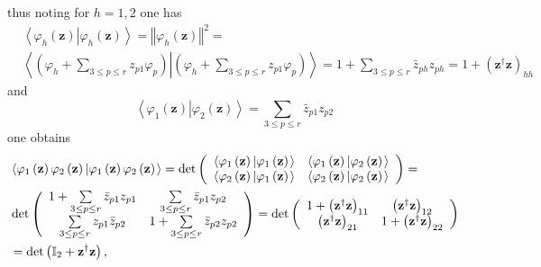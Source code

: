 \documentclass[aps,preprint]{revtex4}%
\begin{document}
thus noting for $h=1,2$ one has
\begin{align}
&  \left\langle \varphi_{h}\left(  \mathbf{z}\right)  \left\vert \varphi
_{h}\left(  \mathbf{z}\right)  \right.  \right\rangle =\left\Vert \varphi
_{h}\left(  \mathbf{z}\right)  \right\Vert ^{2}=\nonumber\\
&  \left\langle \left(  \varphi_{h}+\sum\limits_{3\leq p\leq r}z_{p1}%
\varphi_{p}\right)  \left\vert \left(  \varphi_{h}+\sum\limits_{3\leq p\leq
r}z_{p1}\varphi_{p}\right)  \right.  \right\rangle =1+\sum\limits_{3\leq p\leq
r}\bar{z}_{ph}z_{ph}=1+\left(  \mathbf{z}^{\dagger}\mathbf{z}\right)
_{hh}\nonumber
\end{align}
and
\begin{equation}
\left\langle \varphi_{1}\left(  \mathbf{z}\right)  \left\vert \varphi
_{2}\left(  \mathbf{z}\right)  \right.  \right\rangle =\sum\limits_{3\leq
p\leq r}\bar{z}_{p1}z_{p2}%
\end{equation}
one obtains
\begin{align}
&  \left\langle \varphi_{1}\left(  \mathbf{z}\right)  \varphi_{2}\left(
\mathbf{z}\right)  \left\vert \varphi_{1}\left(  \mathbf{z}\right)
\varphi_{2}\left(  \mathbf{z}\right)  \right.  \right\rangle =\det\left(
\begin{array}
[c]{cc}%
\left\langle \varphi_{1}\left(  \mathbf{z}\right)  \left\vert \varphi
_{1}\left(  \mathbf{z}\right)  \right.  \right\rangle  & \left\langle
\varphi_{1}\left(  \mathbf{z}\right)  \left\vert \varphi_{2}\left(
\mathbf{z}\right)  \right.  \right\rangle \\
\left\langle \varphi_{2}\left(  \mathbf{z}\right)  \left\vert \varphi
_{1}\left(  \mathbf{z}\right)  \right.  \right\rangle  & \left\langle
\varphi_{2}\left(  \mathbf{z}\right)  \left\vert \varphi_{2}\left(
\mathbf{z}\right)  \right.  \right\rangle
\end{array}
\right)  =\nonumber\\
&  \det\left(
\begin{array}
[c]{cc}%
1+\sum\limits_{3\leq p\leq r}\bar{z}_{p1}z_{p1} & \sum\limits_{3\leq p\leq
r}\bar{z}_{p1}z_{p2}\\
\sum\limits_{3\leq p\leq r}z_{p1}\bar{z}_{p2} & 1+\sum\limits_{3\leq p\leq
r}\bar{z}_{p2}z_{p2}%
\end{array}
\right)  =\det\left(
\begin{array}
[c]{cc}%
1+\left(  \mathbf{z}^{\dagger}\mathbf{z}\right)  _{11} & \left(
\mathbf{z}^{\dagger}\mathbf{z}\right)  _{12}\\
\left(  \mathbf{z}^{\dagger}\mathbf{z}\right)  _{21} & 1+\left(
\mathbf{z}^{\dagger}\mathbf{z}\right)  _{22}%
\end{array}
\right) \nonumber\\
&  =\det\left(  \mathbb{I}_{2}+\mathbf{z}^{\dagger}\mathbf{z}\right)  ,
\end{align}
\end{document}
